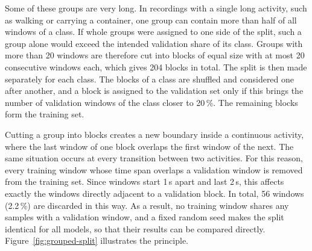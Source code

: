 Some of these groups are very long. In recordings with a single long activity,
such as walking or carrying a container, one group can contain more than half of
all windows of a class. If whole groups were assigned to one side of the split,
such a group alone would exceed the intended validation share of its class.
Groups with more than 20 windows are therefore cut into blocks of equal size with
at most 20 consecutive windows each, which gives 204 blocks in total. The split is
then made separately for each class. The blocks of a class are shuffled and
considered one after another, and a block is assigned to the validation set only
if this brings the number of validation windows of the class closer to 20\,\%.
The remaining blocks form the training set.

Cutting a group into blocks creates a new boundary inside a continuous activity,
where the last window of one block overlaps the first window of the next. The same
situation occurs at every transition between two activities. For this reason,
every training window whose time span overlaps a validation window is removed
from the training set. Since windows start 1\,s apart and last 2\,s, this affects
exactly the windows directly adjacent to a validation block. In total, 56 windows
(2.2\,\%) are discarded in this way. As a result, no training window shares any
samples with a validation window, and a fixed random seed makes the split
identical for all models, so that their results can be compared directly.
Figure~\ref{fig:grouped-split} illustrates the principle.

